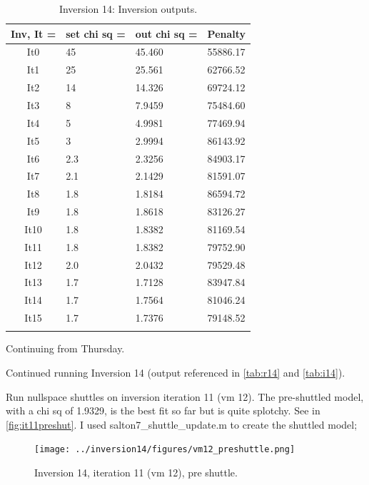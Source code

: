 \documentclass[fontsize=11pt, %
                             paper=a4, %
                             twoside, %
                             captions=tableheading,
                             index=totoc,
                             hyperref]{labbook}
\begin{document}
\begin{addmargin}[4cm]{0cm}
\clearpage

\begin{table}[ht]
\label{tab:i14}
\raggedleft
\begin{tabular}{c l l l}
\toprule
\textbf{Inv, It = } & \textbf{set chi sq =} & \textbf{out chi sq =} & \textbf{Penalty} \\
\toprule
It0 & 45 & 45.460 & 55886.17\\
It1 & 25 & 25.561 & 62766.52\\
It2 & 14 & 14.326 & 69724.12\\
It3 & 8 & 7.9459 & 75484.60\\
It4 & 5 & 4.9981 & 77469.94\\
It5 & 3 & 2.9994 & 86143.92\\
It6 & 2.3 & 2.3256 & 84903.17\\
It7 & 2.1 & 2.1429 & 81591.07\\
It8 & 1.8 & 1.8184 & 86594.72\\
It9 & 1.8 & 1.8618 & 83126.27\\
It10 & 1.8 & 1.8382 & 81169.54\\
It11 & 1.8 & 1.8382 & 79752.90\\
It12 & 2.0 & 2.0432 & 79529.48\\
It13 & 1.7 & 1.7128 & 83947.84\\
It14 & 1.7 & 1.7564 & 81046.24\\
It15 & 1.7 & 1.7376 & 79148.52\\
\bottomrule\\
\end{tabular}
\caption{Inversion 14: Inversion outputs.}
\end{table}

\clearpage


Continuing from Thursday.  

Continued running Inversion 14 (output referenced in \autoref{tab:r14} and \autoref{tab:i14}).

Run nullspace shuttles on inversion iteration 11 (vm 12).  The pre-shuttled model, with a chi sq of 1.9329, is the best fit so far but is quite splotchy.  See in \autoref{fig:it11preshut}.  I used salton7\_shuttle\_update.m to create the shuttled model; 

\begin{figure}[h!]
\raggedleft
\texttt{[image: ../inversion14/figures/vm12\_preshuttle.png]}
\caption{Inversion 14, iteration 11 (vm 12), pre shuttle.}
\label{fig:it11preshut}
\end{figure}


\end{addmargin}
\end{document}
